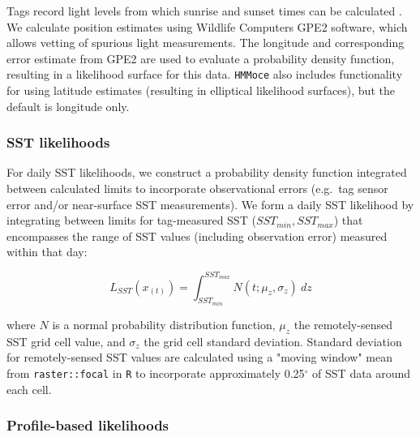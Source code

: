 Tags record light levels from which sunrise and sunset times can be
calculated \citep{Hill2001}. We calculate position estimates using
Wildlife Computers GPE2 software, which allows vetting of spurious light
measurements. The longitude and corresponding error estimate from GPE2
are used to evaluate a probability density function, resulting in a
likelihood surface for this data. \texttt{HMMoce} also includes
functionality for using latitude estimates (resulting in elliptical
likelihood surfaces), but the default is longitude only.

\subsubsection*{SST likelihoods}

For daily SST likelihoods, we construct a probability density function
integrated between calculated limits \citep{LeBris2013a} to incorporate
observational errors (e.g.~tag sensor error and/or near-surface SST
measurements). We form a daily SST likelihood by integrating between
limits for tag-measured SST ($SST_{min},SST_{max}$) that encompasses
the range of SST values (including observation error) measured within
that day:

\begin{equation}
L_{SST}(x_{(t)}) = \int_{SST_{min}}^{SST_{max}} N(t; \mu_z, \sigma_z)~dz
\label{eq:a1e2}
\end{equation}

where $N$ is a normal probability distribution function, $\mu_z$ the
remotely-sensed SST grid cell value, and $\sigma_z$ the grid cell
standard deviation. Standard deviation for remotely-sensed SST values
are calculated using a "moving window" mean from
\texttt{raster::focal} in \texttt{R} to incorporate approximately 0.25$^{\circ}$
of SST data around each cell.

\subsubsection*{Profile-based
likelihoods}

